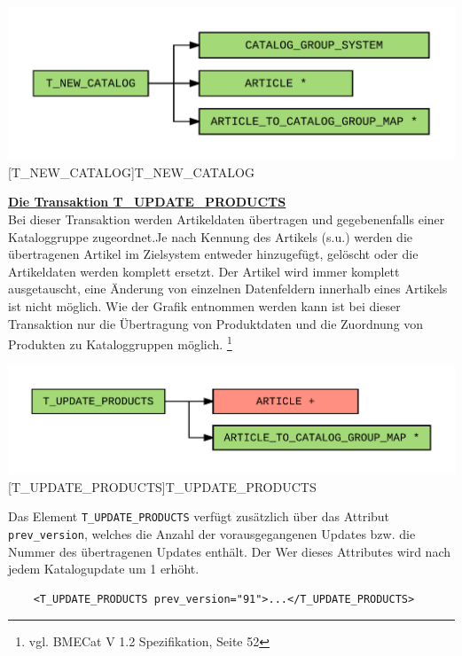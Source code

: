 	
	\begin{minipage}{\linewidth}
		\vspace{1em}
		\centering
		\includegraphics[width=0.65\linewidth]{img/newCatalog}
		[T\_NEW\_CATALOG]{T\_NEW\_CATALOG}
		\label{fig:header}
		\vspace{1em}
	\end{minipage}
	
	\textbf{\underline{Die Transaktion T\_UPDATE\_PRODUCTS}}\\
	
	Bei dieser Transaktion werden Artikeldaten übertragen und gegebenenfalls einer Kataloggruppe zugeordnet.Je nach Kennung des Artikels (s.u.)  werden die übertragenen
	Artikel im Zielsystem entweder hinzugefügt, gelöscht oder die Artikeldaten werden komplett ersetzt.
	Der Artikel wird immer komplett ausgetauscht, eine Änderung von einzelnen Datenfeldern innerhalb eines Artikels ist nicht möglich.
	Wie der Grafik entnommen werden kann ist bei dieser Transaktion nur die Übertragung von Produktdaten und die Zuordnung von Produkten zu Kataloggruppen möglich. \footnote{vgl. BMECat V 1.2 Spezifikation, Seite 52}
	
	\begin{minipage}{\linewidth}
		\vspace{1em}
		\centering
		\includegraphics[width=0.65\linewidth]{img/updateProducts}
		[T\_UPDATE\_PRODUCTS]{T\_UPDATE\_PRODUCTS}
		\label{fig:header}
		\vspace{1em}
	\end{minipage}
	
	Das Element \texttt{T\_UPDATE\_PRODUCTS} verfügt zusätzlich über das Attribut \texttt{prev\_version}, welches die Anzahl der vorausgegangenen Updates bzw. die Nummer des übertragenen Updates enthält. Der Wer dieses Attributes wird nach jedem Katalogupdate um 1 erhöht.
	
	\begin{lstlisting}
	<T_UPDATE_PRODUCTS prev_version="91">...</T_UPDATE_PRODUCTS>
	\end{lstlisting}
	
